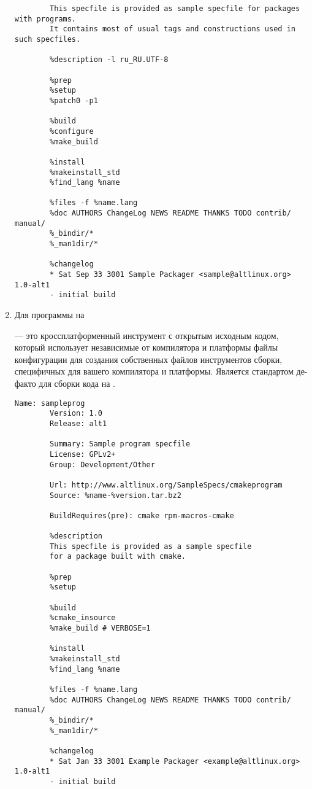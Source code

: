 \begin{enumerate}
\begin{Verbatim}[breaklines=true,breakanywhere=true,xleftmargin=-0.25\textwidth]
		%description
		This specfile is provided as sample specfile for packages with programs.
		It contains most of usual tags and constructions used in such specfiles.
		
		%description -l ru_RU.UTF-8
		
		%prep
		%setup
		%patch0 -p1
		
		%build
		%configure
		%make_build
		
		%install
		%makeinstall_std
		%find_lang %name
		
		%files -f %name.lang
		%doc AUTHORS ChangeLog NEWS README THANKS TODO contrib/ manual/
		%_bindir/*
		%_man1dir/*
		
		%changelog
		* Sat Sep 33 3001 Sample Packager <sample@altlinux.org> 1.0-alt1
		- initial build
	\end{Verbatim}
	
	\item Для программы на 
	
	 --- это кроссплатформенный инструмент с открытым исходным кодом, который использует независимые от компилятора и платформы файлы конфигурации для создания собственных файлов инструментов сборки, специфичных для вашего компилятора и платформы. Является стандартом де-факто для сборки кода на .
	\begin{Verbatim}[breaklines=true,breakanywhere=true,xleftmargin=-0.25\textwidth]
		Name: sampleprog
		Version: 1.0
		Release: alt1
		
		Summary: Sample program specfile
		License: GPLv2+
		Group: Development/Other
		
		Url: http://www.altlinux.org/SampleSpecs/cmakeprogram
		Source: %name-%version.tar.bz2
		
		BuildRequires(pre): cmake rpm-macros-cmake
		
		%description
		This specfile is provided as a sample specfile
		for a package built with cmake.
		
		%prep
		%setup
		
		%build
		%cmake_insource
		%make_build # VERBOSE=1
		
		%install
		%makeinstall_std
		%find_lang %name
		
		%files -f %name.lang
		%doc AUTHORS ChangeLog NEWS README THANKS TODO contrib/ manual/
		%_bindir/*
		%_man1dir/*
		
		%changelog
		* Sat Jan 33 3001 Example Packager <example@altlinux.org> 1.0-alt1
		- initial build
	\end{Verbatim}
	

\end{enumerate}
